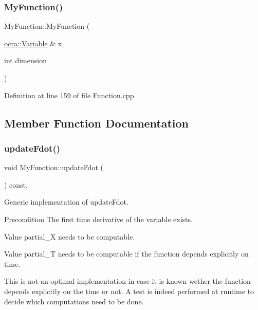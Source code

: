 \subsubsection{\texorpdfstring{My\+Function()}{MyFunction()}}
{\footnotesize\ttfamily My\+Function\+::\+My\+Function (\begin{DoxyParamCaption}\item[{\hyperlink{classocra_1_1Variable}{ocra\+::\+Variable} \&}]{x,  }\item[{int}]{dimension }\end{DoxyParamCaption})\hspace{0.3cm}{\ttfamily [inline]}}



Definition at line 159 of file Function.\+cpp.



\subsection{Member Function Documentation}
\hypertarget{classMyFunction_af0219da97114570582c6a02cf072a7db}{}\label{classMyFunction_af0219da97114570582c6a02cf072a7db} 
\subsubsection{\texorpdfstring{update\+Fdot()}{updateFdot()}}
{\footnotesize\ttfamily void My\+Function\+::update\+Fdot (\begin{DoxyParamCaption}{ }\end{DoxyParamCaption}) const\hspace{0.3cm}{\ttfamily [inline]}, {\ttfamily [virtual]}}

Generic implementation of update\+Fdot.

\begin{DoxyPrecond}{Precondition}
The first time derivative of the variable exists. 

Value partial\+\_\+X needs to be computable. 

Value partial\+\_\+T needs to be computable if the function depends explicitly on time.
\end{DoxyPrecond}
This is not an optimal implementation in case it is known wether the function depends explicitly on the time or not. A test is indeed performed at runtime to decide which computations need to be done. 

